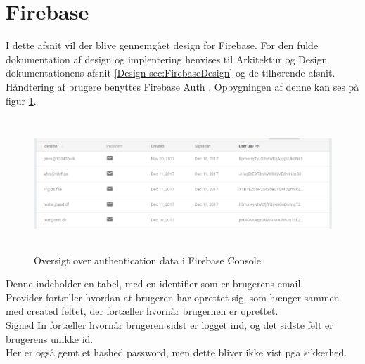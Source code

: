 \section{Firebase}
I dette afsnit vil der blive gennemgået design for Firebase. For den fulde dokumentation af design og implentering henvises til Arkitektur og Design dokumentationens afsnit \ref{Design-sec:FirebaseDesign} og de tilhørende afsnit. \\

Håndtering af brugere benyttes Firebase Auth \cite{FirebaseAuth}. Opbygningen af denne kan ses på figur \ref{fig:FirebaseAuthPNG}.

\begin{figure}[H] %
	\centering
	\includegraphics[height=5cm, width=15cm]{Design/Firebase/FirebaseAuth}
	\caption{Oversigt over authentication data i Firebase Console}
	\label{fig:FirebaseAuthPNG}
\end{figure}
Denne indeholder en tabel, med en identifier som er brugerens email. \\
Provider fortæller hvordan at brugeren har oprettet sig, som hænger sammen med created feltet, der fortæller hvornår brugernen er oprettet. \\
Signed In fortæller hvornår brugeren sidst er logget ind, og det sidste felt er brugerens unikke id. \\
Her er også gemt et hashed password, men dette bliver ikke vist pga sikkerhed. \\

\clearpage


